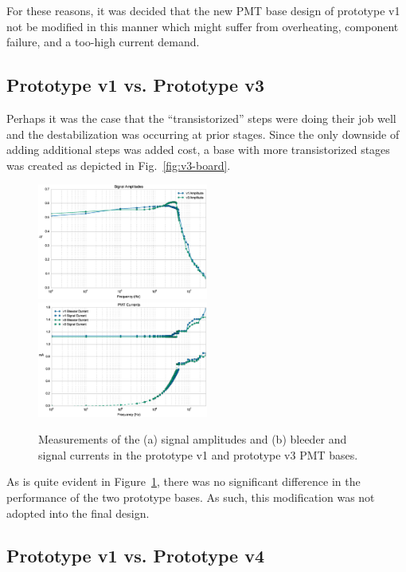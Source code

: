 For these reasons, it was decided that the new PMT base design of prototype v1 not be modified in this manner which might suffer from overheating, component failure, and a too-high current demand.

\subsection{Prototype v1 vs. Prototype v3}

Perhaps it was the case that the ``transistorized'' steps were doing their job well and the destabilization was occurring at prior stages. Since the only downside of adding additional steps was added cost, a base with more transistorized stages was created as depicted in Fig.~\ref{fig:v3-board}.

\begin{figure}[h]
	\centerline{
		\mbox{\includegraphics[width=0.5\textwidth]{figures/pmtupgrade/Test_v3_Amp.eps} \includegraphics[width=0.5\textwidth]{figures/pmtupgrade/Test_v3_Current.eps}}}
	\caption{Measurements of the (a) signal amplitudes and (b) bleeder and signal currents in the prototype v1 and prototype v3 PMT bases.}
	\label{fig:test-v3}
\end{figure}

As is quite evident in Figure~\ref{fig:test-v3}, there was no significant difference in the performance of the two prototype bases. As such, this modification was not adopted into the final design.

\subsection{Prototype v1 vs. Prototype v4}

